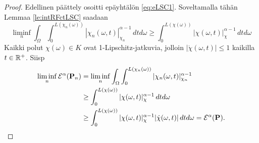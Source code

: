 \documentclass[12pt,oneside,a4paper]{amsbook} %
\begin{document}
\begin{proof}
    Edellinen päättely osoitti epäyhtälön \eqref{eq:eLSC1}. Soveltamalla tähän Lemmaa \ref{le:intRFctLSC} saadaan
    \begin{equation*}
        \liminf_n \int_\Omega \int_0^{L(\chi_n(\omega))}|\chi_n(\omega, t)|_{\chi_n}^{\alpha-1} \, dtd\omega\ge \int_0^{L(\chi(\omega))}|\chi(\omega, t)|_{\chi}^{\alpha-1} \, dtd\omega
    \end{equation*}
    Kaikki polut  $\chi(\omega) \in K$ ovat 1-Lipschitz-jatkuvia, jolloin $|\dot \chi(\omega, t)| \le 1$ kaikilla $t \in \mathbb{R}^+$. Siisp
    \begin{align*}
         \liminf_n \mathcal{E}^\alpha(\mathbf{P}_n) &=  \liminf_n \int_\Omega \int_0^{L(\chi_n(\omega))}|\chi_n(\omega, t)|_{\chi_n}^{\alpha-1} \\
         &\ge \int_0^{L(\chi(\omega))}|\chi(\omega, t)|_{\chi}^{\alpha-1} \, dtd\omega \\
         &\ge \int_0^{L(\chi(\omega))}|\chi(\omega, t)|_{\chi}^{\alpha-1}|\dot \chi(\omega, t)| \, dtd\omega = \mathcal{E}^\alpha(\mathbf{P}).
    \end{align*}
\end{proof}
\end{document}
